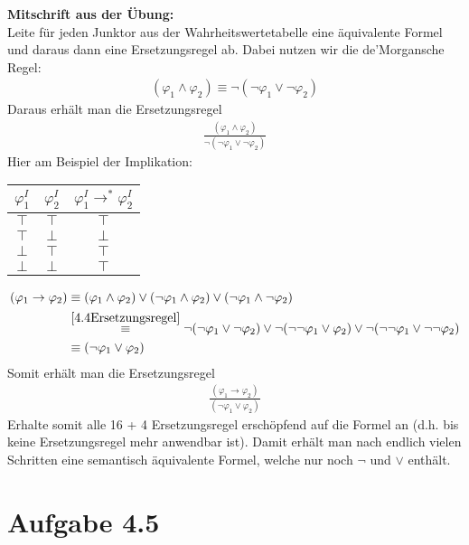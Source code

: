 \documentclass[12pt,a4paper]{article}
\begin{document}
\textbf{Mitschrift aus der Übung:}\\
Leite für jeden Junktor aus der Wahrheitswertetabelle eine äquivalente Formel und daraus dann eine Ersetzungsregel ab. Dabei nutzen wir die de'Morgansche Regel:
\begin{align*}
(\varphi_1\wedge\varphi_2)\equiv\neg(\neg\varphi_1\vee\neg\varphi_2)
\end{align*}
Daraus erhält man die Ersetzungsregel
\begin{align}\label{4.4Ersetzungsregel}
\frac{(\varphi_1\wedge\varphi_2)}{\neg(\neg\varphi_1\vee\neg\varphi_2)}
\end{align}
Hier am Beispiel der Implikation:\\
\begin{tabular}{c|c||c}
$\varphi_1^I$ & $\varphi_2^I$ & $\varphi_1^I\to^\ast\varphi_2^I$ \\ \hline
$\top$ & $\top$ & $\top$\\
$\top$ & $\bot$ & $\bot$\\
$\bot$ & $\top$ & $\top$\\
$\bot$ & $\bot$ & $\top$
\end{tabular}
\begin{align*}
(\varphi_1\to\varphi_2)
&\equiv (\varphi_1\wedge\varphi_2)\vee(\neg\varphi_1\wedge\varphi_2)\vee(\neg\varphi_1\wedge\neg\varphi_2)\\
&\stackrel{\eqref{4.4Ersetzungsregel}}{\equiv}\neg(\neg\varphi_1\vee\neg\varphi_2)\vee\neg(\neg\neg\varphi_1\vee\varphi_2)\vee\neg(\neg\neg\varphi_1\vee\neg\neg\varphi_2)\\
&\equiv(\neg\varphi_1\vee\varphi_2)
\end{align*}
Somit erhält man die Ersetzungsregel
\begin{align*}
\frac{(\varphi_1\to\varphi_2)}{(\neg\varphi_1\vee\varphi_2)}
\end{align*}
Erhalte somit alle 16 + 4 Ersetzungsregel erschöpfend auf die Formel an (d.h. bis keine Ersetzungsregel mehr anwendbar ist). Damit erhält man nach endlich vielen Schritten eine semantisch äquivalente Formel, welche nur noch $\neg$ und $\vee$ enthält.

\section*{Aufgabe 4.5}
\end{document}
